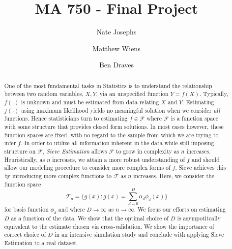 \documentclass[12pt]{article}  %
\title{MA 750 - Final Project}
\author{
  Nate Josephs\\
  \and
  Matthew Wiens 
  \and 
  Ben Draves
}
\begin{document}
\maketitle 
\begin{abstract} One of the most fundamental tasks in Statistics is to understand the relationship between two random variables, $X,Y$, via an unspecified function $Y = f(X)$. Typically, $f(\cdot)$ is unknown and must be estimated from data relating $X$ and $Y$. Estimating $f(\cdot)$ using maximum likelihood yields no meaningful solution when we consider \textit{all} functions. Hence statisticians turn to estimating $f\in\mathcal{F}$ where $\mathcal{F}$ is a function space with some structure that provides closed form solutions. In most cases however, these function spaces are fixed, with no regard to the sample from which we are trying to infer $f$. In order to utilize all information inherent in the data while still imposing structure on $\mathcal{F}$, \textit{Sieve Estimation} allows $\mathcal{F}$ to grow in complexity as $n$ increases. Heuristically, as $n$ increases, we attain a more robust understanding of $f$ and should allow our modeling procedure to consider more complex forms of $f$. Sieve achieves this by introducing more complex functions to $\mathcal{F}$ as $n$ increases. Here, we consider the function space $$\mathcal{F}_n = \Big\{g(x): g(x) = \sum_{d=0}^{D}\alpha_d\phi_d(x)\Big\}$$ for basis function $\phi_d$ and where $D\to\infty$ as $n\to\infty$. We focus our efforts on estimating $D$ as a function of the data. We show that the optimal choice of $D$ is asympotitcally equivalent to the estimate chosen via cross-validation. We show the importance of correct choice of $D$ in an intensive simulation study and conclude with applying Sieve Estimation to a real dataset. 
\end{abstract}
\end{document}
